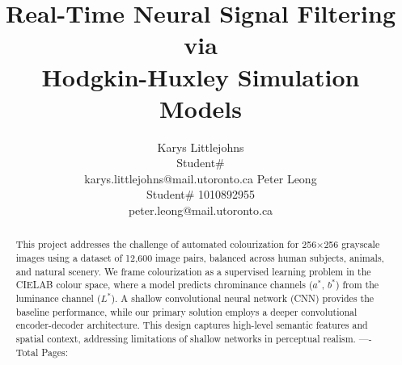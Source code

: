 \documentclass{article} %
\title{Real-Time Neural Signal Filtering via \\
Hodgkin-Huxley Simulation Models}
\author{Karys Littlejohns\\
Student\# \\
karys.littlejohns@mail.utoronto.ca
\And
Peter Leong \\
Student\# 1010892955 \\
peter.leong@mail.utoronto.ca \\
\AND
}
\begin{document}
\maketitle

\vspace{-6ex}

\begin{abstract}
This project addresses the challenge of automated colourization for 256$\times$256 grayscale images using a dataset of 12,600 image pairs, balanced across human subjects, 
animals, and natural scenery. We frame colourization as a supervised learning problem in the CIELAB colour space, where a model predicts chrominance channels ($a^*$, $b^*$) 
from the luminance channel ($L^*$). A shallow convolutional neural network (CNN) provides the baseline performance, while our primary solution employs a deeper convolutional 
encoder-decoder architecture. This design captures high-level semantic features and spatial context, addressing limitations of shallow networks in perceptual realism.
----Total Pages: \pageref{last_page}
\end{abstract}

\vspace{2ex}
\end{document}
